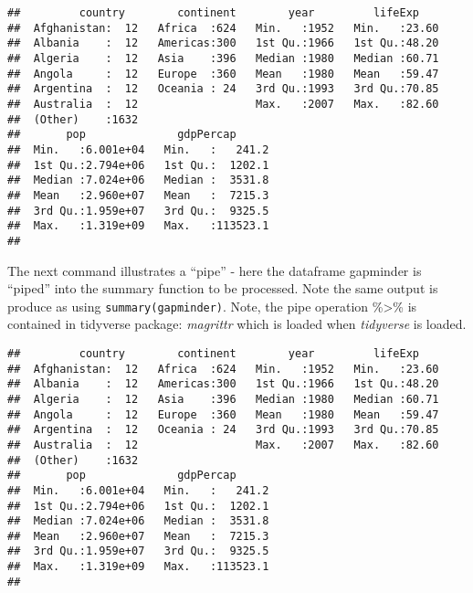 \documentclass[
]{book}
\newenvironment{Shaded}{\begin{snugshade}}{\end{snugshade}}
\newcommand{\CommentTok}[1]{\textcolor[rgb]{0.56,0.35,0.01}{\textit{#1}}}
\newcommand{\KeywordTok}[1]{\textcolor[rgb]{0.13,0.29,0.53}{\textbf{#1}}}
\newcommand{\NormalTok}[1]{#1}
\newcommand{\OperatorTok}[1]{\textcolor[rgb]{0.81,0.36,0.00}{\textbf{#1}}}
\newcommand{\StringTok}[1]{\textcolor[rgb]{0.31,0.60,0.02}{#1}}
\begin{document}
\begin{verbatim}
##         country        continent        year         lifeExp     
##  Afghanistan:  12   Africa  :624   Min.   :1952   Min.   :23.60  
##  Albania    :  12   Americas:300   1st Qu.:1966   1st Qu.:48.20  
##  Algeria    :  12   Asia    :396   Median :1980   Median :60.71  
##  Angola     :  12   Europe  :360   Mean   :1980   Mean   :59.47  
##  Argentina  :  12   Oceania : 24   3rd Qu.:1993   3rd Qu.:70.85  
##  Australia  :  12                  Max.   :2007   Max.   :82.60  
##  (Other)    :1632                                                
##       pop              gdpPercap       
##  Min.   :6.001e+04   Min.   :   241.2  
##  1st Qu.:2.794e+06   1st Qu.:  1202.1  
##  Median :7.024e+06   Median :  3531.8  
##  Mean   :2.960e+07   Mean   :  7215.3  
##  3rd Qu.:1.959e+07   3rd Qu.:  9325.5  
##  Max.   :1.319e+09   Max.   :113523.1  
## 
\end{verbatim}

The next command illustrates a ``pipe'' - here the dataframe gapminder is ``piped'' into
the summary function to be processed. Note the same output is produce as using
\texttt{summary(gapminder)}. Note, the pipe operation \%\textgreater\% is contained in tidyverse package: \emph{magrittr} which is loaded when \emph{tidyverse} is loaded.

\begin{Shaded}
\end{Shaded}

\begin{verbatim}
##         country        continent        year         lifeExp     
##  Afghanistan:  12   Africa  :624   Min.   :1952   Min.   :23.60  
##  Albania    :  12   Americas:300   1st Qu.:1966   1st Qu.:48.20  
##  Algeria    :  12   Asia    :396   Median :1980   Median :60.71  
##  Angola     :  12   Europe  :360   Mean   :1980   Mean   :59.47  
##  Argentina  :  12   Oceania : 24   3rd Qu.:1993   3rd Qu.:70.85  
##  Australia  :  12                  Max.   :2007   Max.   :82.60  
##  (Other)    :1632                                                
##       pop              gdpPercap       
##  Min.   :6.001e+04   Min.   :   241.2  
##  1st Qu.:2.794e+06   1st Qu.:  1202.1  
##  Median :7.024e+06   Median :  3531.8  
##  Mean   :2.960e+07   Mean   :  7215.3  
##  3rd Qu.:1.959e+07   3rd Qu.:  9325.5  
##  Max.   :1.319e+09   Max.   :113523.1  
## 
\end{verbatim}
\end{document}
